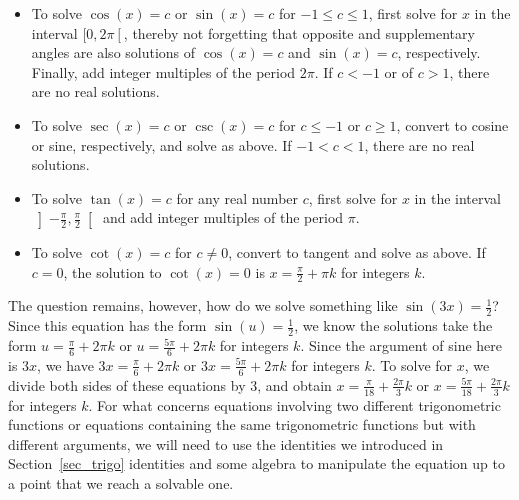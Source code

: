 \begin{itemize}
	
	\item To solve $\cos(x) = c$ or $\sin(x) = c$ for $-1 \leq c \leq 1$, first solve for $x$ in the interval $[0,2\pi\left[\right.$, thereby not forgetting that opposite and supplementary angles are also solutions  of $\cos(x)=c$ and $\sin(x)=c$, respectively. Finally, add integer multiples of the period $2\pi$.  If $c < -1$ or of $c > 1$, there are no real solutions.
	
	\item To solve $\sec(x) = c$ or $\csc(x) = c$ for $c \leq -1$ or $c \geq 1$,  convert to cosine or sine, respectively, and solve as above.  If $-1 < c < 1$, there are no real solutions.
	
	\item To solve  $\tan(x) = c$ for any real number $c$,  first solve for $x$ in the interval $\left]-\frac{\pi}{2}, \frac{\pi}{2}\right[$ and add integer multiples of the period $\pi$.
	
	\item  To solve  $\cot(x) = c$ for $c \neq 0$, convert to tangent and solve as above.  If $c = 0$, the solution to $\cot(x) = 0$ is $x = \frac{\pi}{2} + \pi k$ for integers $k$.
	
\end{itemize}


The question remains, however, how do we solve something like $\sin(3x) = \frac{1}{2}$?  Since this equation has the form $\sin(u) = \frac{1}{2}$, we know the solutions take the form  $u= \frac{\pi}{6} + 2\pi k$ or $u = \frac{5\pi}{6} + 2\pi k$ for integers $k$. Since the argument of sine here is $3x$, we have $3x= \frac{\pi}{6} + 2\pi k$ or $3x = \frac{5\pi}{6} + 2\pi k$ for integers $k$. To solve for $x$, we divide both sides of these equations by $3$, and obtain $x = \frac{\pi}{18} + \frac{2\pi}{3} k$ or $x = \frac{5\pi}{18} + \frac{2\pi}{3}k$ for integers $k$.  For what concerns equations involving two different trigonometric functions or  equations containing the same trigonometric functions but with different arguments, we will need to use the identities we introduced in Section~\ref{sec_trigo} identities and some algebra to manipulate the equation up to a point that we reach a solvable one.

